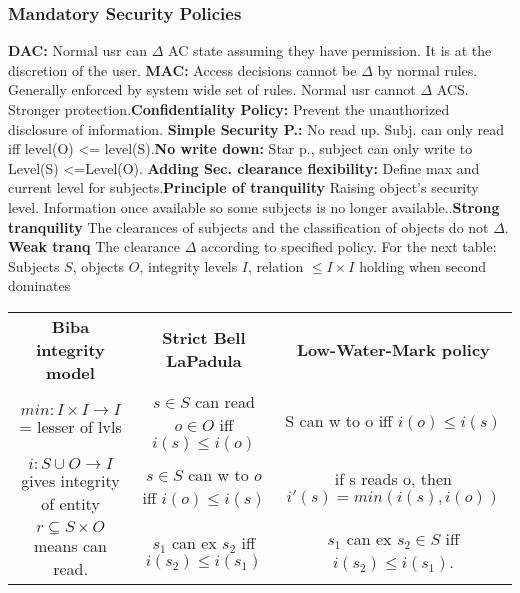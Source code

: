 \documentclass[a4paper,1pt]{article}
\begin{document}
\subsubsection{Mandatory Security Policies}
{\bf DAC:} Normal usr can $\Delta$ AC state assuming they have permission. It is at the discretion of the user. {\bf MAC:} Access decisions cannot be $\Delta$ by normal rules. Generally enforced by system wide set of rules. Normal usr cannot $\Delta$ ACS. Stronger protection.{\bf Confidentiality Policy:} Prevent the unauthorized disclosure of information. {\bf Simple Security P.:} No read up. Subj. can only read iff level(O) <= level(S).{\bf No write down:} Star p., subject can only write to Level(S) <=Level(O). {\bf Adding Sec. clearance flexibility:} Define max and current level for subjects.{\bf Principle of tranquility} Raising object's security level. Information once available so some subjects is no longer available..{\bf Strong tranquility} The clearances of subjects and the classification of objects do not $\Delta$. {\bf Weak tranq} The clearance $\Delta$ according to specified policy. For the next table: Subjects $S$, objects $O$, integrity levels $I$, relation $\leq I\times I$ holding when second dominates \\
\begin{tabular}{| c | c | c |}
  \hline
  {\bf Biba integrity model}& {\bf Strict Bell LaPadula} & {\bf Low-Water-Mark policy  }\\
  $min:I\times I \rightarrow I$= lesser of lvls & $s \in S$ can read $o\in O$ iff $i(s)\leq i(o)$    & S can w to o iff $i(o)\leq i(s)$ \\
  \hline
  $i:S\cup O \rightarrow I$ gives integrity of entity & $s\in S$ can w to $o$ iff $i(o)\leq i(s)$& if s reads o, then $i'(s)=min(i(s),i(o))$ \\
  \hline
  $r \subseteq S\times O$ means can read. & $s_1$ can ex $s_2$ iff $i(s_2)\leq i(s_1) $ & $s_1$ can ex $s_2\in S$ iff $i(s_2)\leq i(s_1)$.\\
  \hline
\end{tabular}

%
%
\end{document}
